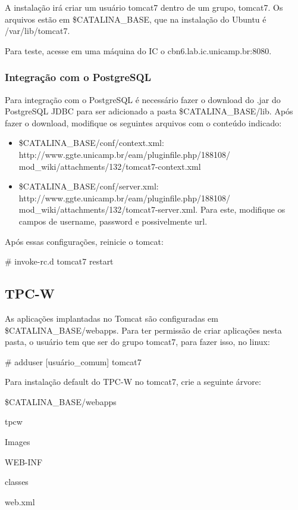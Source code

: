 \documentclass[a4paper,10pt]{article}
\begin{document}
        A instalação irá criar um usuário tomcat7 dentro de um grupo, tomcat7. Os arquivos estão em \$CATALINA\_BASE, que na instalação do Ubuntu é /var/lib/tomcat7.

        Para teste, acesse em uma máquina do IC o cbn6.lab.ic.unicamp.br:8080.

        \subsubsection{Integração com o PostgreSQL}
        Para integração com o PostgreSQL é necessário fazer o download do .jar do PostgreSQL JDBC para ser adicionado a pasta \$CATALINA\_BASE/lib. Após fazer o download, modifique os seguintes arquivos com o conteúdo indicado:

        \begin{itemize}
        \setlength{\itemindent}{-.0in}
            \item \$CATALINA\_BASE/conf/context.xml: http://www.ggte.unicamp.br/eam/pluginfile.php/188108/
            mod\_wiki/attachments/132/tomcat7-context.xml
            \item \$CATALINA\_BASE/conf/server.xml: http://www.ggte.unicamp.br/eam/pluginfile.php/188108/
            mod\_wiki/attachments/132/tomcat7-server.xml. Para este, modifique os campos de username, password e possivelmente url.
        \end{itemize}

        Após essas configurações, reinicie o tomcat:

        \begin{spverbatim}
        # invoke-rc.d tomcat7 restart
        \end{spverbatim}

        \subsection{TPC-W}

        As aplicações implantadas no Tomcat são configuradas em \$CATALINA\_BASE/webapps. Para ter permissão de criar aplicações nesta pasta, o usuário tem que ser do grupo tomcat7, para fazer isso, no linux:

        \begin{spverbatim}
        # adduser [usuário_comum] tomcat7
        \end{spverbatim}

        Para instalação default do TPC-W no tomcat7, crie a seguinte árvore:
        \begin{spverbatim}

            \$CATALINA_BASE/webapps

                tpcw

                     Images

                     WEB-INF

                        classes

                        web.xml


        \end{spverbatim}
\end{document}
